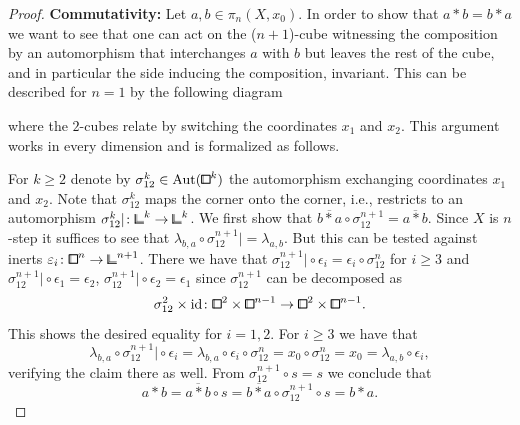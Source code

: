 \begin{proof}
\textbf{Commutativity:}
Let $a,b\in\pi_n(X,x_0)$.
In order to show that $a*b = b*a$ we want to see that
one can act on the ($n+1$)-cube witnessing the composition by an automorphism that interchanges $a$ with $b$ but leaves the rest of the cube, and in particular the side inducing the composition, invariant.
This can be described for $n=1$ by the following diagram
\begin{center}
\end{center}
where the $2$-cubes relate by switching the coordinates $x_1$ and $x_2$.
This argument works in every dimension and is formalized as follows.

For $k\geq 2$ denote by $\sigma_{12}^k\in\Aut({\bbox}^{k})$ the automorphism exchanging coordinates $x_1$ and $x_2$.
Note that $\sigma_{12}^k$ maps the corner onto the corner,
i.e., restricts to an automorphism $\sigma_{12}^k\rvert\colon{\bbcor}^k\to{\bbcor}^k$.
We first show that $\overline{b*a}\circ\sigma_{12}^{n+1} = \overline{a*b}$.
Since $X$ is $n$-step it suffices to see that $\lambda_{b,a}\circ\sigma_{12}^{n+1}\rvert = \lambda_{a,b}$.
But this can be tested against inerts $\epsilon_i\colon{\bbox}^n\to{\bbcor}^{n+1}$.
There we have that $\sigma_{12}^{n+1}\rvert\circ\epsilon_i = \epsilon_i\circ\sigma_{12}^n$ for $i\geq 3$
and $\sigma_{12}^{n+1}\rvert\circ\epsilon_1 = \epsilon_2$, $\sigma_{12}^{n+1}\rvert\circ\epsilon_2 = \epsilon_1$
since $\sigma_{12}^{n+1}$ can be decomposed as
\[
    \sigma_{12}^2\times\id\colon{\bbox}^2\times{\bbox}^{n-1}\to{\bbox}^2\times{\bbox}^{n-1}.
\]
This shows the desired equality for $i = 1,2$.
For $i\geq 3$ we have that
\[
      \lambda_{b,a}\circ\sigma_{12}^{n+1}\rvert\circ\epsilon_i
    = \lambda_{b,a}\circ\epsilon_i\circ\sigma_{12}^n
    = x_0\circ\sigma_{12}^n
    = x_0
    = \lambda_{a,b}\circ\epsilon_i,
\]
verifying the claim there as well.
From $\sigma_{12}^{n+1}\circ s = s$ we conclude that
\[
    a*b = \overline{a*b}\circ s = \overline{b*a}\circ\sigma_{12}^{n+1}\circ s = b*a.
\]


\end{proof}
